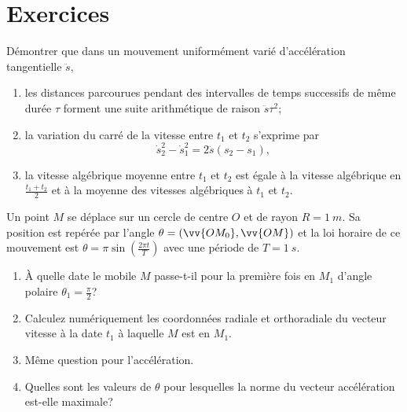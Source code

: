 \section{Exercices}%
\label{chap1-sec:exercices}%
\begin{exercice}%
  Démontrer que dans un mouvement uniformément varié d'accélération 
  tangentielle \(\ddot{s}\),
  \begin{enumerate}%
  \item les distances parcourues pendant des intervalles de temps successifs de 
    même durée \(\tau\) forment une suite arithmétique de raison 
      \(\ddot{s}\tau^2\);
  \item la variation du carré de la vitesse entre \(t_1\) et \(t_2\) s'exprime 
    par
    \begin{equation}%
      \dot{s}_2^2-\dot{s}_1^2 = 2 \ddot{s}(s_2-s_1),%
    \end{equation}%
  \item la vitesse algébrique moyenne entre \(t_1\) et \(t_2\) est égale à la 
    vitesse algébrique en \(\frac{t_1+t_2}{2}\) et à la moyenne des vitesses 
      algébriques à \(t_1\) et \(t_2\).
  \end{enumerate}%
\end{exercice}%
%
\begin{exercice}%
  Un point \(M\) se déplace sur un cercle de centre \(O\) et de rayon 
  \(R=\SI{1}{m}\). Sa position est repérée par l'angle 
  \(\theta=(\vv{OM_0},\vv{OM})\) et la loi horaire de ce mouvement est 
  \(\theta=\pi\sin\left(\frac{2\pi t}{T}\right)\) avec une période de 
  \(T=\SI{1}{s}\).
  \begin{enumerate}%
  \item À quelle date le mobile \(M\) passe-t-il pour la première fois en 
    \(M_1\) d'angle polaire \(\theta_1=\frac{\pi}{2}\)?
  \item Calculez numériquement les coordonnées radiale et orthoradiale du 
    vecteur vitesse à la date \(t_1\) à laquelle \(M\) est en \(M_1\).
  \item Même question pour l'accélération.
  \item Quelles sont les valeurs de \(\theta\) pour lesquelles la norme du 
    vecteur accélération est-elle maximale?
  \end{enumerate}%
\end{exercice}%
%

